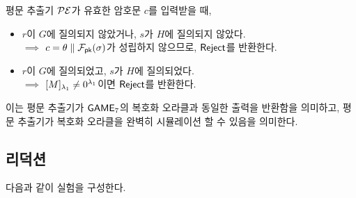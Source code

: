 \begin{memo}
	평문 추출기 $\mathcal{PE}$가 유효한 암호문 $c$를 입력받을 때,
	\begin{itemize}
		\item $r$이 $G$에 질의되지 않았거나, $s$가 $H$에 질의되지 않았다. \\
		$\implies$ $c = \theta \parallel \mathcal{F}_{\textsf{pk}}(\sigma)$가 성립하지 않으므로, $\textsf{Reject}$를 반환한다.
		\item $r$이 $G$에 질의되었고, $s$가 $H$에 질의되었다. \\
		$\implies$ $[M]_{\lambda_1} \neq 0^{\lambda_1}$이면 $\textsf{Reject}$를 반환한다.
	\end{itemize}
	이는 평문 추출기가 $\textsf{GAME}_7$의 복호화 오라클과 동일한 출력을 반환함을
	의미하고, 평문 추출기가 복호화 오라클을 완벽히 시뮬레이션 할 수 있음을
	의미한다.
\end{memo}

\newpage
\subsection{리덕션}

다음과 같이 실험을 구성한다.


